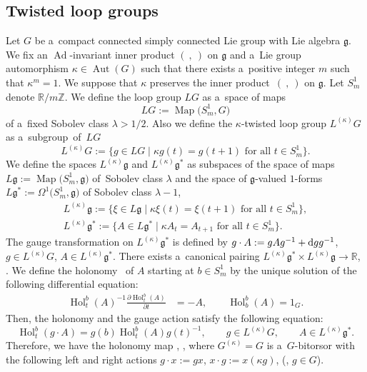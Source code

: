 \documentclass[pdftex]{sigma}
\numberwithin{equation}{section}
\theoremstyle{definition}
\newcommand{\Map}{\operatorname{Map}}
\newcommand{\Ad}{\operatorname{Ad}}
\newcommand{\Aut}{\operatorname{Aut}}
\newcommand{\Hol}{\operatorname{Hol}}
\newcommand{\bR}{\mathbb{R}}
\newcommand{\bZ}{\mathbb{Z}}
\begin{document}
\subsection{Twisted loop groups}\label{Twisted loop groups}
Let $G$ be a~compact connected simply connected Lie group
with Lie algebra $\mathfrak{g}$. We fix an $\Ad$-invariant inner product $(\ ,\ )$ on $\mathfrak{g}$
and a~Lie group automorphism $\kappa \in \Aut(G)$ such that there exists a~positive integer $m$ such that $\kappa^m=1$.
We suppose that $\kappa$ preserves the inner product~$(\ ,\ )$ on $\mathfrak{g}$.
Let $S^{1}_m$ denote $\bR/ m \bZ$.
We define the loop group $LG$ as a~space of maps
\[LG := \Map\bigl(S^1_m,G\bigr)\]
of a~fixed Sobolev class $\lambda > 1/2$.
Also we define the $\kappa$-twisted loop group $L^{(\kappa)}G$ as a~subgroup~of~$LG$
\[L^{(\kappa)}G := \bigl\{g \in LG \mid \kappa g (t) = g(t+1) \text{ for all } t \in S^1_m\bigr\}.\]
We define the spaces $L^{(\kappa)}\mathfrak{g}$ and $L^{(\kappa)}\mathfrak{g}^*$ as subspaces of the space of maps $L\mathfrak{g}:= \Map\bigl(S^1_m, \mathfrak{g}\bigr)$ of~Sobolev class $\lambda$ and the space of $\mathfrak{g}$-valued $1$-forms $L\mathfrak{g}^* := \Omega^1\bigl(S^1_m,\mathfrak{g}\bigr)$ of Sobolev class $\lambda-1$,
\begin{gather*}
 L^{(\kappa)}\mathfrak{g} := \bigl\{\xi \in L\mathfrak{g}\mid \kappa \xi (t) = \xi (t+1) \text{ for all }t \in S^1_m \bigr\}, \\
 L^{(\kappa)}\mathfrak{g}^{*} := \bigl\{A \in L\mathfrak{g}^*\mid \kappa A_t = A_{t+1} \text{ for all }t \in S^1_m\bigr\}.
\end{gather*}
The gauge transformation on $L^{(\kappa)}\mathfrak{g}^*$ is defined by $g \cdot A := gAg^{-1} + {\rm d}gg^{-1}$, $ g \in L^{(\kappa)}G$, $ A \in L^{(\kappa)}\mathfrak{g}^*$.
There exists a~canonical pairing $L^{(\kappa)}\mathfrak{g}^* \times L^{(\kappa)}\mathfrak{g} \to \bR$, .
We define the holonomy~\smash{$\Hol^{b}_t(A)$} of $A$ starting at $b \in S^{1}_m$ by the unique solution of the following differential equation:
\begin{align*}
 \Hol^{b}_t(A)^{-1} \frac{\partial \Hol^{b}_t(A)}{\partial t} &= -A,\qquad
 \Hol^{b}_b(A) = 1_G.
\end{align*}
Then, the holonomy and the gauge action satisfy the following equation:
\[
\Hol^{b}_t(g\cdot A) = g(b) \Hol ^{b}_t(A) g(t)^{-1}, \qquad g \in L^{(\kappa)}G,\qquad A \in L^{(\kappa)}\mathfrak{g}^*.
\]
Therefore, we have the holonomy map \smash{$\Hol^{(\kappa)} \colon L^{(\kappa)}\mathfrak{g}^{*} \to G^{(\kappa)}$}, \smash{$ A \mapsto \Hol^{0}_1(A)$},
where $G^{(\kappa)} = G$ is a~$G$-bitorsor with the following left and right actions
$g\cdot x := gx$, $x \cdot g := x (\kappa g)$, \big(, $ g \in G$\big).
\end{document}
